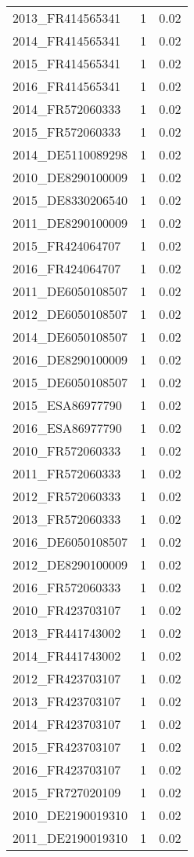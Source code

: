 \begin{table*}[htbp]
\begin{tabular}{lrr}
2013_FR414565341 & 1 & 0.02 \\
2014_FR414565341 & 1 & 0.02 \\
2015_FR414565341 & 1 & 0.02 \\
2016_FR414565341 & 1 & 0.02 \\
2014_FR572060333 & 1 & 0.02 \\
2015_FR572060333 & 1 & 0.02 \\
2014_DE5110089298 & 1 & 0.02 \\
2010_DE8290100009 & 1 & 0.02 \\
2015_DE8330206540 & 1 & 0.02 \\
2011_DE8290100009 & 1 & 0.02 \\
2015_FR424064707 & 1 & 0.02 \\
2016_FR424064707 & 1 & 0.02 \\
2011_DE6050108507 & 1 & 0.02 \\
2012_DE6050108507 & 1 & 0.02 \\
2014_DE6050108507 & 1 & 0.02 \\
2016_DE8290100009 & 1 & 0.02 \\
2015_DE6050108507 & 1 & 0.02 \\
2015_ESA86977790 & 1 & 0.02 \\
2016_ESA86977790 & 1 & 0.02 \\
2010_FR572060333 & 1 & 0.02 \\
2011_FR572060333 & 1 & 0.02 \\
2012_FR572060333 & 1 & 0.02 \\
2013_FR572060333 & 1 & 0.02 \\
2016_DE6050108507 & 1 & 0.02 \\
2012_DE8290100009 & 1 & 0.02 \\
2016_FR572060333 & 1 & 0.02 \\
2010_FR423703107 & 1 & 0.02 \\
2013_FR441743002 & 1 & 0.02 \\
2014_FR441743002 & 1 & 0.02 \\
2012_FR423703107 & 1 & 0.02 \\
2013_FR423703107 & 1 & 0.02 \\
2014_FR423703107 & 1 & 0.02 \\
2015_FR423703107 & 1 & 0.02 \\
2016_FR423703107 & 1 & 0.02 \\
2015_FR727020109 & 1 & 0.02 \\
2010_DE2190019310 & 1 & 0.02 \\
2011_DE2190019310 & 1 & 0.02 \\

\end{tabular}
\end{table*}

